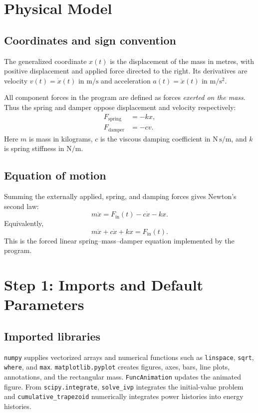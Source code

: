 \documentclass[11pt]{article}
\begin{document}
\section{Physical Model}
\subsection{Coordinates and sign convention}
The generalized coordinate $x(t)$ is the displacement of the mass in metres, with positive displacement and applied force directed to the right. Its derivatives are velocity $v(t)=\dot{x}(t)$ in $\mathrm{m/s}$ and acceleration $a(t)=\ddot{x}(t)$ in $\mathrm{m/s^2}$.

All component forces in the program are defined as forces \emph{exerted on the mass}. Thus the spring and damper oppose displacement and velocity respectively:
\begin{align}
F_{\mathrm{spring}} &= -kx,\\
F_{\mathrm{damper}} &= -cv.
\end{align}
Here $m$ is mass in kilograms, $c$ is the viscous damping coefficient in $\mathrm{N\,s/m}$, and $k$ is spring stiffness in $\mathrm{N/m}$.

\subsection{Equation of motion}
Summing the externally applied, spring, and damping forces gives Newton's second law:
\begin{equation}
 m\ddot{x} = F_{\mathrm{in}}(t)-c\dot{x}-kx.
 \label{eq:motion}
\end{equation}
Equivalently,
\begin{equation}
 m\ddot{x}+c\dot{x}+kx=F_{\mathrm{in}}(t).
\end{equation}
This is the forced linear spring--mass--damper equation implemented by the program.

\section{Step 1: Imports and Default Parameters}
\subsection{Imported libraries}
\texttt{numpy} supplies vectorized arrays and numerical functions such as \texttt{linspace}, \texttt{sqrt}, \texttt{where}, and \texttt{max}. \texttt{matplotlib.pyplot} creates figures, axes, bars, line plots, annotations, and the rectangular mass. \texttt{FuncAnimation} updates the animated figure. From \texttt{scipy.integrate}, \texttt{solve\_ivp} integrates the initial-value problem and \texttt{cumulative\_trapezoid} numerically integrates power histories into energy histories.
\end{document}

